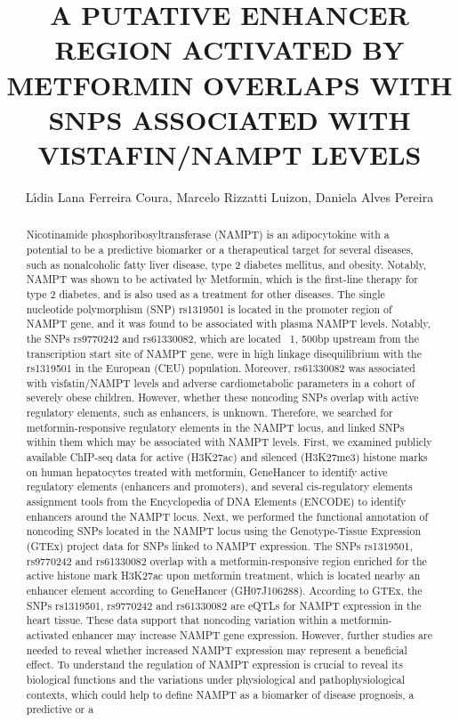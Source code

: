 \documentclass[twoside]{article}
\title{\vspace{-15mm}\fontsize{24pt}{10pt}\selectfont\textbf{ A PUTATIVE ENHANCER REGION ACTIVATED BY METFORMIN OVERLAPS WITH SNPS ASSOCIATED WITH VISTAFIN/NAMPT LEVELS }} %
\author{ L\'{\i}dia Lana Ferreira Coura,  Marcelo Rizzatti Luizon,  Daniela Alves Pereira }
\affil{ UNIVERSIDADE FEDERAL DE MINAS GERAIS }
\date{}
\begin{document}
  
  
  \maketitle %
  
  
  \thispagestyle{fancy} %
  
  
  \begin{abstract}
  Nicotinamide phosphoribosyltransferase (NAMPT) is an adipocytokine with a potential to be a predictive biomarker or a therapeutical target for several diseases,  such as nonalcoholic fatty liver disease,  type 2 diabetes mellitus,  and obesity. Notably,  NAMPT was shown to be activated by Metformin,  which is the first-line therapy for type 2 diabetes,  and is also used as a treatment for other diseases. The single nucleotide polymorphism (SNP) rs1319501 is located in the promoter region of NAMPT gene,  and it was found to be associated with plasma NAMPT levels. Notably,  the SNPs rs9770242 and rs61330082,  which are located ~1, 500bp upstream from the transcription start site of NAMPT gene,  were in high linkage disequilibrium with the rs1319501 in the European (CEU) population. Moreover,  rs61330082 was associated with visfatin/NAMPT levels and adverse cardiometabolic parameters in a cohort of severely obese children. However,  whether these noncoding SNPs overlap with active regulatory elements,  such as enhancers,  is unknown. Therefore,  we searched for metformin-responsive regulatory elements in the NAMPT locus,  and linked SNPs within them which may be associated with NAMPT levels. First,  we examined publicly available ChIP-seq data for active (H3K27ac) and silenced (H3K27me3) histone marks on human hepatocytes treated with metformin,  GeneHancer to identify active regulatory elements (enhancers and promoters),  and several cis-regulatory elements assignment tools from the Encyclopedia of DNA Elements (ENCODE) to identify enhancers around the NAMPT locus. Next,  we performed the functional annotation of noncoding SNPs located in the NAMPT locus using the Genotype-Tissue Expression (GTEx) project data for SNPs linked to NAMPT expression. The SNPs rs1319501,  rs9770242 and rs61330082 overlap with a metformin-responsive region enriched for the active histone mark H3K27ac upon metformin treatment,  which is located nearby an enhancer element according to GeneHancer (GH07J106288). According to GTEx,  the SNPs rs1319501,  rs9770242 and rs61330082 are eQTLs for NAMPT expression in the heart tissue. These data support that noncoding variation within a metformin-activated enhancer may increase NAMPT gene expression. However,  further studies are needed to reveal whether increased NAMPT expression may represent a beneficial effect. To understand the regulation of NAMPT expression is crucial to reveal its biological functions and the variations under physiological and pathophysiological contexts,  which could help to define NAMPT as a biomarker of disease prognosis,  a predictive or a 
\end{abstract}
\end{document}
